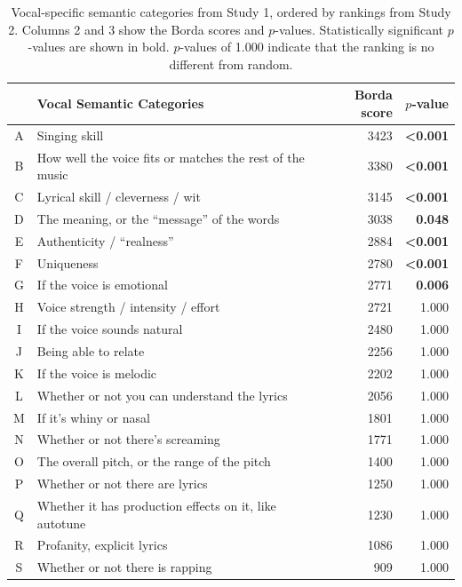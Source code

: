 \documentclass{article}
\begin{document}
\begin{table}[h!]
\begin{center}
\begin{tabular}{| c | l r r |}
\hline
& \textbf{Vocal Semantic Categories} &\textbf{Borda score} & \textbf{$p$-value}\\
\hline
A & Singing skill & 3423 & \textbf{\textless 0.001} \\
B & How well the voice fits or matches the rest of the music & 3380 & \textbf{\textless 0.001}\\
C & Lyrical skill / cleverness / wit & 3145 & \textbf{\textless 0.001}\\
D & The meaning, or the ``message'' of the words & 3038 & \textbf{0.048}\\
E & Authenticity / ``realness'' & 2884 & \textbf{\textless 0.001}\\
F & Uniqueness & 2780 & \textbf{\textless 0.001}\\
G & If the voice is emotional & 2771 & \textbf{0.006}\\
H & Voice strength / intensity / effort & 2721 & 1.000\\
I & If the voice sounds natural & 2480 & 1.000\\
J & Being able to relate & 2256 & 1.000\\
K & If the voice is melodic & 2202 & 1.000\\
L & Whether or not you can understand the lyrics & 2056 & 1.000\\
M & If it's whiny or nasal & 1801 & 1.000\\
N & Whether or not there's screaming & 1771 & 1.000\\
O & The overall pitch, or the range of the pitch & 1400 & 1.000\\
P & Whether or not there are lyrics & 1250 & 1.000\\
Q & Whether it has production effects on it, like autotune & 1230 & 1.000\\
R & Profanity, explicit lyrics & 1086 & 1.000\\
S & Whether or not there is rapping & 909 & 1.000\\
\hline
\end{tabular}
\end{center}
\caption{Vocal-specific semantic categories from Study 1, ordered by rankings from Study 2. Columns 2 and 3 show the Borda scores and $p$-values. Statistically significant $p$-values are shown in bold. $p$-values of 1.000 indicate that the ranking is no different from random.}\label{tab:voc-attributes}
\end{table}
\end{document}
